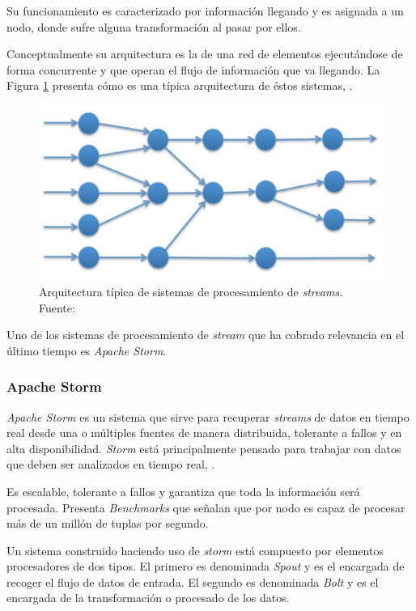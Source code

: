 Su funcionamiento es caracterizado por información llegando y es asignada a un nodo, donde sufre alguna transformación al pasar por ellos. 

Conceptualmente su arquitectura es la de una red de elementos ejecutándose de forma concurrente y que operan el flujo de información que va llegando. La Figura \ref{fig:ArqSPS} presenta cómo es una típica arquitectura de éstos sistemas, \cite{SPExplained}.

\begin{figure}[H]
	\centering
	\captionsetup{justification=centering}
	\includegraphics[scale=0.8]{images/ArqSPS.png}
	\caption[Arquitectura típica de sistemas de procesamiento de \textit{streams}.]{Arquitectura típica de sistemas de procesamiento de \textit{streams}.\\Fuente: \cite{SPExplained}}
	\label{fig:ArqSPS}
\end{figure}

Uno de los sistemas de procesamiento de \textit{stream} que ha cobrado relevancia en el último tiempo es \textit{Apache Storm}.

\subsubsection*{Apache Storm}
\label{subsubsec:ApacheStorm}

\textit{Apache Storm} es un sistema que sirve para recuperar \textit{streams} de datos en tiempo real desde una o múltiples fuentes de manera distribuida, tolerante a fallos y en alta disponibilidad. \textit{Storm} está principalmente pensado para trabajar con datos que deben ser analizados en tiempo real, \cite{Storm}.

Es escalable, tolerante a fallos y garantiza que toda la información será procesada. Presenta \textit{Benchmarks} que señalan que por nodo es capaz de procesar más de un millón de tuplas por segundo.

Un sistema construido haciendo uso de \textit{storm} está compuesto por elementos procesadores de dos tipos. El primero es denominada \textit{Spout} y es el encargada de recoger el flujo de datos de entrada. El segundo es denominada \textit{Bolt} y es el encargada de la transformación o procesado de los datos.

